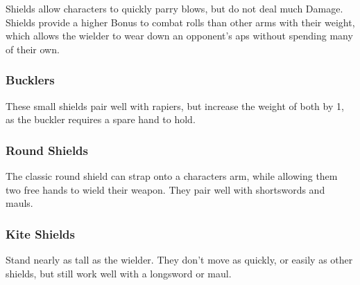 \begin{multicols}{2}
Shields allow characters to quickly parry blows, but do not deal much Damage.
Shields provide a higher Bonus to combat rolls than other arms with their \gls{weight}, which allows the wielder to wear down an opponent's \glspl{ap} without spending many of their own.

\subsubsection{Bucklers}

These small shields pair well with rapiers, but increase the \gls{weight} of both by 1, as the buckler requires a spare hand to hold.

\subsubsection{Round Shields}

The classic round shield can strap onto a characters arm, while allowing them two free hands to wield their weapon.
They pair well with shortswords and mauls.

\subsubsection{Kite Shields}

Stand nearly as tall as the wielder.
They don't move as quickly, or easily as other shields, but still work well with a longsword or maul.

\shieldchart

\end{multicols}

